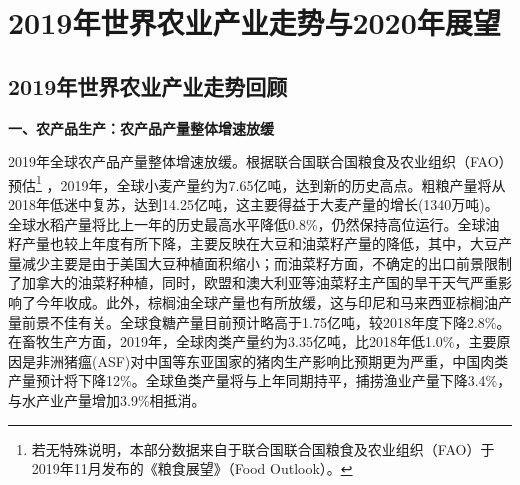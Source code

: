 \documentclass{progbookcn}
\begin{document}
\section{2019年世界农业产业走势与2020年展望}
\subsection{2019年世界农业产业走势回顾}
\textbf{一、农产品生产：农产品产量整体增速放缓}

2019年全球农产品产量整体增速放缓。根据联合国联合国粮食及农业组织（FAO）预估\footnote{若无特殊说明，本部分数据来自于联合国联合国粮食及农业组织（FAO）于2019年11月发布的《粮食展望》（Food Outlook）。} ，2019年，全球小麦产量约为7.65亿吨，达到新的历史高点。粗粮产量将从2018年低迷中复苏，达到14.25亿吨，这主要得益于大麦产量的增长(1340万吨)。全球水稻产量将比上一年的历史最高水平降低0.8\%，仍然保持高位运行。全球油籽产量也较上年度有所下降，主要反映在大豆和油菜籽产量的降低，其中，大豆产量减少主要是由于美国大豆种植面积缩小；而油菜籽方面，不确定的出口前景限制了加拿大的油菜籽种植，同时，欧盟和澳大利亚等油菜籽主产国的旱干天气严重影响了今年收成。此外，棕榈油全球产量也有所放缓，这与印尼和马来西亚棕榈油产量前景不佳有关。全球食糖产量目前预计略高于1.75亿吨，较2018年度下降2.8\%。在畜牧生产方面，2019年，全球肉类产量约为3.35亿吨，比2018年低1.0\%，主要原因是非洲猪瘟(ASF)对中国等东亚国家的猪肉生产影响比预期更为严重，中国肉类产量预计将下降12\%。全球鱼类产量将与上年同期持平，捕捞渔业产量下降3.4\%，与水产业产量增加3.9\%相抵消。
\end{document}
